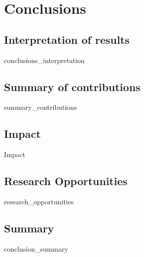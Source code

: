 \chapter{Conclusions}

\section{Interpretation of results}
{conclusions_interpretation}

\section{Summary of contributions}
{summary_contributions}

\section{Impact}
{Impact}

\section{Research Opportunities}
{research_opportunities}

\section{Summary}
{conclusion_summary}